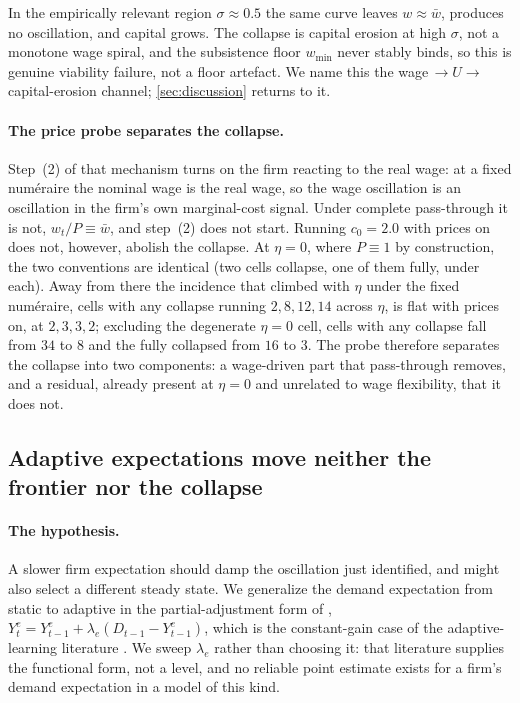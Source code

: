 In the empirically relevant region $\sigma \approx 0.5$ the same curve leaves
$w \approx \bar w$, produces no oscillation, and capital grows. The
collapse is capital erosion at high $\sigma$, not a monotone wage spiral, and
the subsistence floor $w_{\min}$ never stably binds, so this is genuine
viability failure, not a floor artefact. We name this the
wage\,$\to U \to$\,capital-erosion channel; \cref{sec:discussion}
returns to it.

\paragraph{The price probe separates the collapse.} Step~(2) of that mechanism
turns on the firm reacting to the real wage: at a fixed numéraire the
nominal wage is the real wage, so the wage oscillation is an oscillation in the
firm's own marginal-cost signal. Under complete pass-through it is not, 
$w_t/P \equiv \bar w$, and step~(2) does not start. Running $c_0 = 2.0$ with
prices on does not, however, abolish the collapse. At $\eta = 0$, where
$P \equiv 1$ by construction, the two conventions are identical (two cells
collapse, one of them fully, under each). Away from there the incidence that
climbed with $\eta$ under the fixed numéraire, cells with any collapse running
$2, 8, 12, 14$ across $\eta$, is flat with prices on, at $2, 3, 3, 2$;
excluding the degenerate $\eta = 0$ cell, cells with any collapse fall from $34$
to $8$ and the fully collapsed from $16$ to $3$. The probe therefore
separates the collapse into two components: a wage-driven part that
pass-through removes, and a residual, already present at $\eta = 0$ and unrelated
to wage flexibility, that it does not.

\subsection{Adaptive expectations move neither the frontier nor the collapse}
\label{sec:expectations}

\paragraph{The hypothesis.} A slower firm expectation should damp the
oscillation just identified, and might also select a different steady state.
We generalize the demand expectation from static to adaptive in the
partial-adjustment form of \citet{Nerlove1958},
$Y^e_t = Y^e_{t-1} + \lambda_e (D_{t-1} - Y^e_{t-1})$, which is the
constant-gain case of the adaptive-learning literature
\citep{EvansHonkapohja2001}. We sweep $\lambda_e$ rather than choosing it: that
literature supplies the functional form, not a level, and no reliable point
estimate exists for a firm's demand expectation in a model of this kind.

